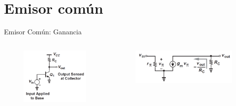 \documentclass[t,aspectratio=169]{beamer}
\begin{document}
\section{Emisor común}
\begin{frame}{Emisor Común: Ganancia}

\vspace{-5mm}\begin{columns}
\begin{column}{0.5\textwidth}

\begin{figure}[H]
    \centering
    \includegraphics[width=\textwidth]{figuras/emisor_comun_circuito.png}
\end{figure}

\end{column}
\begin{column}{0.5\textwidth}

\begin{figure}[H]
    \centering
    \includegraphics[width=\textwidth]{figuras/emisor_comun_ganancia.png}
\end{figure}

\end{column}
\end{columns}
    
\end{frame}
\end{document}
